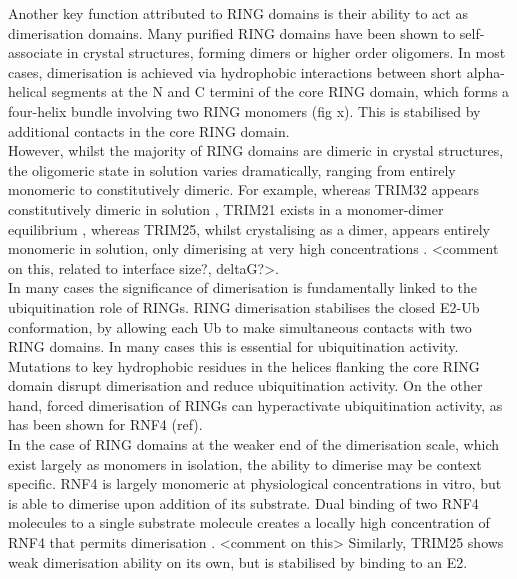\documentclass[12pt]{"article"}
\begin{document}
Another key function attributed to RING domains is their ability to act as dimerisation domains. Many purified RING domains have been shown to self-associate in crystal structures, forming dimers or higher order oligomers. In most cases, dimerisation is achieved via hydrophobic interactions between short alpha-helical segments at the N and C termini of the core RING domain, which forms a four-helix bundle involving two RING monomers (fig x). This is stabilised by additional contacts in the core RING domain. \\

However, whilst the majority of RING domains are dimeric in crystal structures, the oligomeric state in solution varies dramatically, ranging from entirely monomeric to constitutively dimeric. For example, whereas TRIM32 appears constitutively dimeric in solution \citep{Koliopoulos2016}, TRIM21 exists in a monomer-dimer equilibrium \citep{Dickson2018}, whereas TRIM25, whilst crystalising as a dimer, appears entirely monomeric in solution, only dimerising at very high concentrations \citep{Koliopoulos2016}. <comment on this, related to interface size?, deltaG?>.\\

In many cases the significance of dimerisation is fundamentally linked to the ubiquitination role of RINGs. RING dimerisation stabilises the closed E2-Ub conformation, by allowing each Ub to make simultaneous contacts with two RING domains. In many cases this is essential for ubiquitination activity. Mutations to key hydrophobic residues in the helices flanking the core RING domain disrupt dimerisation and reduce ubiquitination activity. On the other hand, forced dimerisation of RINGs can hyperactivate ubiquitination activity, as has been shown for RNF4 (ref). \\

In the case of RING domains at the weaker end of the dimerisation scale, which exist largely as monomers in isolation, the ability to dimerise may be context specific. RNF4 is largely monomeric at physiological concentrations in vitro, but is able to dimerise upon addition of its substrate. Dual binding of two RNF4 molecules to a single substrate molecule creates a locally high concentration of RNF4 that permits dimerisation \citep{Rojas-Fernandez2014}. <comment on this> Similarly, TRIM25 shows weak dimerisation ability on its own, but is stabilised by binding to an E2. \\
\end{document}
